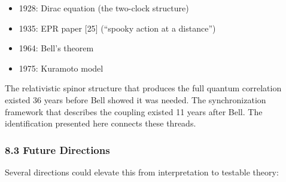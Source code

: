 \documentclass[
]{article}
\providecommand{\tightlist}{%
  \setlength{\itemsep}{0pt}\setlength{\parskip}{0pt}}
\begin{document}
\begin{itemize}
\tightlist
\item
  1928: Dirac equation (the two-clock structure)
\item
  1935: EPR paper {[}25{]} (``spooky action at a distance'')
\item
  1964: Bell's theorem
\item
  1975: Kuramoto model
\end{itemize}

The relativistic spinor structure that produces the full quantum
correlation existed 36 years before Bell showed it was needed. The
synchronization framework that describes the coupling existed 11 years
after Bell. The identification presented here connects these threads.

\subsubsection{8.3 Future Directions}\label{future-directions}

Several directions could elevate this from interpretation to testable
theory:
\end{document}
